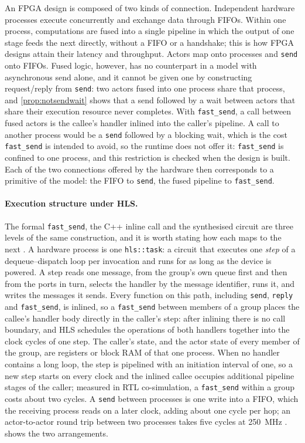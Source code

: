 \documentclass[11pt]{article}
\theoremstyle{definition}
\theoremstyle{remark}
\newcommand{\fs}{\texttt{fast\_send}}
\newcommand{\snd}{\texttt{send}}
\begin{document}
An FPGA design is composed of two kinds of connection. Independent hardware processes
execute concurrently and exchange data through FIFOs. Within one process, computations
are fused into a single pipeline in which the output of one stage feeds the next
directly, without a FIFO or a handshake; this is how FPGA designs attain their latency
and throughput. Actors map onto processes and \snd{} onto FIFOs. Fused logic, however,
has no counterpart in a model with asynchronous send alone, and it cannot be given one
by constructing request/reply from \snd{}: two actors fused into one process share that
process, and \cref{prop:notsendwait} shows that a send followed by a wait between actors
that share their execution resource never completes. With \fs{}, a call between fused
actors is the callee's handler inlined into the caller's pipeline. A call to another
process would be a \snd{} followed by a blocking wait, which is the cost \fs{} is
intended to avoid, so the runtime does not offer it: \fs{} is confined to one process,
and this restriction is checked when the design is built. Each of the two connections
offered by the hardware then corresponds to a primitive of the model: the FIFO to
\snd{}, the fused pipeline to \fs{}.

\paragraph{Execution structure under HLS.} The formal \fs{}, the C++ inline call and the
synthesised circuit are three levels of the same construction, and it is worth stating
how each maps to the next \cite{fpgaactors}. A hardware process is one
\texttt{hls::task}: a circuit that executes one \emph{step} of a dequeue--dispatch loop
per invocation and runs for as long as the device is powered. A step reads one message,
from the group's own queue first and then from the ports in turn, selects the handler by
the message identifier, runs it, and writes the messages it sends. Every function on
this path, including \snd{}, \texttt{reply} and \fs{}, is inlined, so a \fs{} between
members of a group places the callee's handler body directly in the caller's step: after
inlining there is no call boundary, and HLS schedules the operations of both handlers
together into the clock cycles of one step. The caller's state, and the actor state of
every member of the group, are registers or block RAM of that one process. When no
handler contains a long loop, the step is pipelined with an initiation interval of one,
so a new step starts on every clock and the inlined callee occupies additional pipeline
stages of the caller; measured in RTL co-simulation, a \fs{} within a group costs about
two cycles. A \snd{} between processes is one write into a FIFO, which the receiving
process reads on a later clock, adding about one cycle per hop; an actor-to-actor round
trip between two processes takes five cycles at 250~MHz \cite{fpgaactors}.
 shows the two arrangements.
\end{document}
